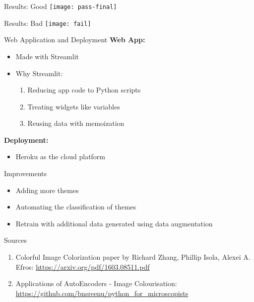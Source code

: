 \documentclass[12pt]{beamer}
\begin{document}
\begin{frame}{Results: Good}
	\texttt{[image: pass-final]}
\end{frame}

\begin{frame}{Results: Bad}
	\texttt{[image: fail]}
\end{frame}

\begin{frame}{Web Application and Deployment}
	\textbf{Web App:}\\
	\begin{itemize}
		\item Made with Streamlit\\
		\item Why Streamlit:\\
			\begin{enumerate}
				\item Reducing app code to Python scripts
				\item Treating widgets like variables
				\item Reusing data with memoization
			\end{enumerate}
	\end{itemize}
	\textbf{Deployment:}
	\begin{itemize}
		\item Heroku as the cloud platform
	\end{itemize}
\end{frame}

\begin{frame}{Improvements}
	\begin{itemize}
		\item Adding more themes
		\item Automating the classification of themes
		\item Retrain with additional data generated using data augmentation
	\end{itemize}
\end{frame}

\begin{frame}{Sources}
	\begin{enumerate}
		\item Colorful Image Colorization paper by Richard Zhang, Phillip Isola, Alexei A. Efros: \textcolor{cyan}{\href{https://arxiv.org/pdf/1603.08511.pdf}{https://arxiv.org/pdf/1603.08511.pdf}}
		\item Applications of AutoEncoders - Image Colourisation: \textcolor{cyan}{\href{https://github.com/bnsreenu/python\_for\_microscopists}{https://github.com/bnsreenu/python\_for\_microscopists}}
	\end{enumerate}
\end{frame}
\end{document}

